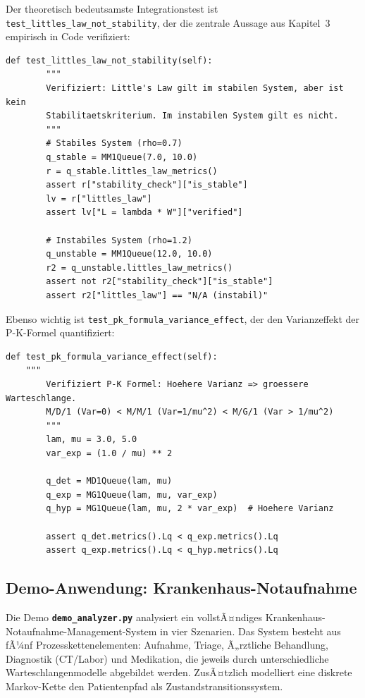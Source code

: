 ﻿\documentclass[a4paper,12pt]{scrreprt}
\theoremstyle{definition}
\begin{document}
Der theoretisch bedeutsamste Integrationstest ist
\texttt{test\_littles\_law\_not\_stability}, der die zentrale Aussage
aus Kapitel~3 empirisch in Code verifiziert:

\begin{lstlisting}[style=python, caption={Test: Little's Law ist kein StabilitÃ¤tskriterium (empirische Verifikation)}, label=lst:test-littles-not-stability]
def test_littles_law_not_stability(self):
        """
        Verifiziert: Little's Law gilt im stabilen System, aber ist kein
        Stabilitaetskriterium. Im instabilen System gilt es nicht.
        """
        # Stabiles System (rho=0.7)
        q_stable = MM1Queue(7.0, 10.0)
        r = q_stable.littles_law_metrics()
        assert r["stability_check"]["is_stable"]
        lv = r["littles_law"]
        assert lv["L = lambda * W"]["verified"]

        # Instabiles System (rho=1.2)
        q_unstable = MM1Queue(12.0, 10.0)
        r2 = q_unstable.littles_law_metrics()
        assert not r2["stability_check"]["is_stable"]
        assert r2["littles_law"] == "N/A (instabil)"
\end{lstlisting}

Ebenso wichtig ist \texttt{test\_pk\_formula\_variance\_effect}, der den
Varianzeffekt der P-K-Formel quantifiziert:

\begin{lstlisting}[style=python, caption={Test: P-K-Formel -- hÃ¶here Varianz ergibt lÃ¤ngere Warteschlange}, label=lst:test-pk]
def test_pk_formula_variance_effect(self):
	"""
        Verifiziert P-K Formel: Hoehere Varianz => groessere Warteschlange.
        M/D/1 (Var=0) < M/M/1 (Var=1/mu^2) < M/G/1 (Var > 1/mu^2)
        """
        lam, mu = 3.0, 5.0
        var_exp = (1.0 / mu) ** 2

        q_det = MD1Queue(lam, mu)
        q_exp = MG1Queue(lam, mu, var_exp)
        q_hyp = MG1Queue(lam, mu, 2 * var_exp)  # Hoehere Varianz

        assert q_det.metrics().Lq < q_exp.metrics().Lq
        assert q_exp.metrics().Lq < q_hyp.metrics().Lq
\end{lstlisting}

\subsection{Demo-Anwendung: Krankenhaus-Notaufnahme}
\label{sec:demo-krankenhaus-system}

Die Demo \texttt{\textbf{demo\_analyzer.py}} analysiert ein vollstÃ¤ndiges
Krankenhaus-Notauf\-nahme-Management-System in vier Szenarien. Das System
besteht aus fÃ¼nf Prozesskettenelementen: Aufnahme, Triage, Ã„rztliche
Behandlung, Diagnostik (CT/Labor) und Medikation, die jeweils durch
unterschiedliche Warteschlangenmodelle abgebildet werden. ZusÃ¤tzlich
modelliert eine diskrete Markov-Kette den Patientenpfad als
Zustandstransitionssystem.
\end{document}

